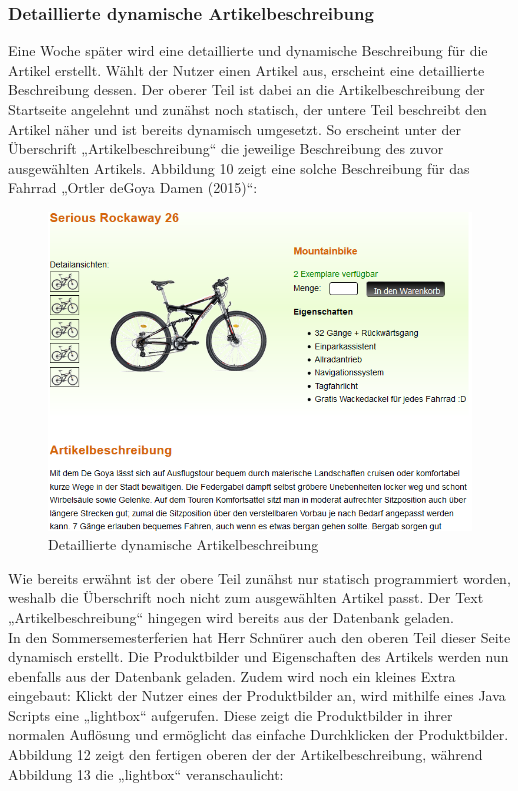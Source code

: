 \subsubsection{Detaillierte dynamische Artikelbeschreibung}

Eine Woche später wird eine detaillierte und dynamische Beschreibung für die Artikel erstellt. Wählt der Nutzer einen Artikel aus, erscheint eine detaillierte Beschreibung dessen. Der oberer Teil ist dabei an die Artikelbeschreibung der Startseite angelehnt und zunähst noch statisch, der untere Teil beschreibt den Artikel näher und ist bereits dynamisch umgesetzt. So erscheint unter der Überschrift „Artikelbeschreibung“ die jeweilige Beschreibung des zuvor ausgewählten Artikels. Abbildung 10 zeigt eine solche Beschreibung für das Fahrrad „Ortler deGoya Damen (2015)“:

\begin{figure}[H]
\begin{center}
\includegraphics[width=150mm]{Bilder/Abbildung11-DynamischeDetailierteArtikelbeschreibung.png}
\end{center}
\caption{Detaillierte dynamische Artikelbeschreibung}
\label{Abbildung11-Detaillierte dynamische Artikelbeschreibung}
\end{figure}

Wie bereits erwähnt ist der obere Teil zunähst nur statisch programmiert worden, weshalb die Überschrift noch nicht zum ausgewählten Artikel passt. Der Text „Artikelbeschreibung“ hingegen wird bereits aus der Datenbank geladen.
\\
In den Sommersemesterferien hat Herr Schnürer auch den oberen Teil dieser Seite dynamisch erstellt. Die Produktbilder und Eigenschaften des Artikels werden nun ebenfalls aus der Datenbank geladen. Zudem wird noch ein kleines Extra eingebaut: Klickt der Nutzer eines der Produktbilder an, wird mithilfe eines Java Scripts eine „lightbox“ aufgerufen. Diese zeigt die Produktbilder in ihrer normalen Auflösung und ermöglicht das einfache Durchklicken der Produktbilder. Abbildung 12 zeigt den fertigen oberen der der Artikelbeschreibung, während Abbildung 13 die „lightbox“ veranschaulicht:

